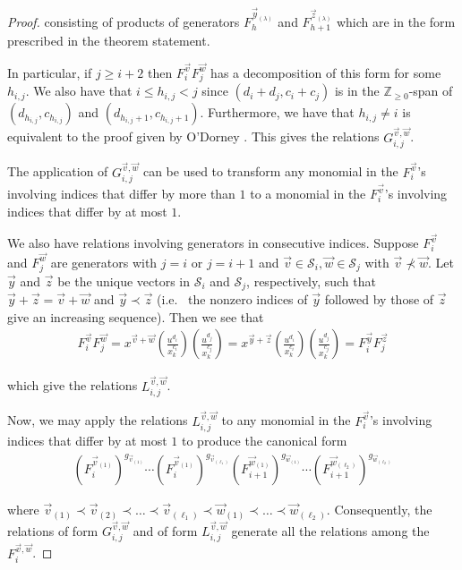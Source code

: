 \documentclass{amsart}
\theoremstyle{plain}
\theoremstyle{definition}
\theoremstyle{remark}
\numberwithin{equation}{section}
\newcommand\bz{{\mathbb Z}}
\newcommand\mss{\mathscr{S}}
\begin{document}
\begin{proof}
\noindent
consisting of products of generators $F_h^{\vec{y}_{(\lambda)}}$
and $F_{h + 1}^{\vec{z}_{(\lambda)}}$ which are in the form
prescribed in the theorem statement.

In particular, if $j \geq i + 2$ then $F_i^{\vec{v}} F_j^{\vec{w}}$
has a decomposition of this form for some $h_{i, j}$. We also have
that $i \leq h_{i, j} < j$ since $(d_i + d_j, c_i + c_j)$ is in the
$\bz_{\geq 0}$-span of $(d_{h_{i, j}}, c_{h_{i, j}})$ and
$(d_{h_{i, j} + 1}, c_{h_{i, j} + 1})$. Furthermore, we have that
$h_{i, j} \neq i$ is equivalent to the proof given by O'Dorney
\cite[Theorem 6]{dorney:canonical}. This gives the relations
$G_{i, j}^{\vec{v}, \vec{w}}$.

The application of $G_{i, j}^{\vec{v}, \vec{w}}$ can be used
to transform any monomial in the $F_i^{\vec{v}}$'s involving
indices that differ by more than $1$ to a monomial in the $F_i
^{\vec{v}}$'s involving indices that differ by at most $1$.

We also have relations involving generators in consecutive
indices. Suppose $F_i^{\vec{v}}$ and $F_j^{\vec{w}}$ are
generators with $j = i$ or $j = i + 1$ and $\vec{v} \in
\mss_i, \vec{w} \in \mss_j$ with $\vec{v} \not\prec \vec{w}$.
Let $\vec{y}$ and $\vec{z}$ be the unique vectors in $\mss_i$ and
$\mss_j$, respectively, such that $\vec{y} + \vec{z} = \vec{v} +
\vec{w}$ and $\vec{y} \prec \vec{z}$ (i.e.~ the nonzero indices
of $\vec{y}$ followed by those of $\vec{z}$ give an increasing
sequence). Then we see that
\begin{align*}
	F_i^{\vec{v}} F_j^{\vec{w}} = x^{\vec{v} + \vec{w}}
																 \left(\frac{u^{d_i}}{x_k^{c_i}}\right)
																 \left(\frac{u^{d_j}}{x_k^{c_j}}\right)
															= x^{\vec{y} + \vec{z}}
																 \left(\frac{u^{d_i}}{x_k^{c_i}}\right)
																 \left(\frac{u^{d_j}}{x_k^{c_j}}\right)
															= F_i^{\vec{y}} F_j^{\vec{z}}
\end{align*}

\noindent 
which give the relations $L_{i, j}^{\vec{v}, \vec{w}}$.

Now, we may apply the relations $L_{i, j}^{\vec{v}, \vec{w}}$
to any monomial in the $F_i^{\vec{v}}$'s involving
indices that differ by at most $1$ to produce the canonical form
\begin{align*}
	(F_i^{\vec{v}_{(1)}})^{g_{\vec{v}_{(1)}}} \cdots
	(F_i^{\vec{v}_{(1)}})^{g_{\vec{v}_{(\ell_1)}}}
	(F_{i + 1}^{\vec{w}_{(1)}})^{g_{\vec{w}_{(1)}}} \cdots
	(F_{i + 1}^{\vec{w}_{(\ell_2)}})^{g_{\vec{w}_{(\ell_2)}}}
\end{align*}

\noindent
where $\vec{v}_{(1)} \prec \vec{v}_{(2)} \prec \ldots \prec
\vec{v}_{(\ell_1)} \prec \vec{w}_{(1)} \prec \ldots \prec
\vec{w}_{(\ell_2)}$. Consequently, the relations of form
$G_{i, j}^{\vec{v}, \vec{w}}$ and of form $L_{i, j}^{\vec{v},
\vec{w}}$ generate all the relations among the $F_{i}^{\vec{v},
\vec{w}}$.
\end{proof}
\end{document}
